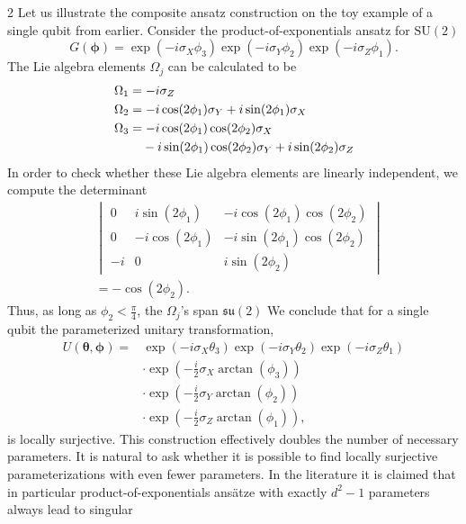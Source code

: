 \documentclass{article}
\renewcommand{\vec}[1]{\ensuremath{\boldsymbol{#1}}}
\begin{document}
\begin{multicols}{2}
Let us illustrate the composite ansatz construction on the toy example of a single qubit from earlier.
Consider the product-of-exponentials ansatz for \(\mathrm{SU}(2)\)
\begin{equation}
    G(\vec{\phi}) = \exp(-i\sigma_X\phi_3)\exp(-i\sigma_Y\phi_2)\exp(-i\sigma_Z\phi_1).
\end{equation}
The Lie algebra elements \(\Omega_j\) can be calculated to be
\begin{align}
    & \Omega_1= -i\sigma_Z \\
    & \Omega_2 = -i\cos(2\phi_1)\sigma_Y + i \sin(2\phi_1)\sigma_X \\
    & \Omega_3 = -i\cos(2\phi_1)\cos(2\phi_2)\sigma_X \\
    & \hphantom{\Omega_3 = } -i\sin(2\phi_1)\cos(2\phi_2)\sigma_Y + i\sin(2\phi_2)\sigma_Z \nonumber
\end{align}
In order to check whether these Lie algebra elements are linearly independent, we compute the determinant
\begin{align}
    &\begin{vmatrix}
        0 & i\sin(2\phi_1) & -i \cos(2\phi_1)\cos(2\phi_2) \\
        0 & -i\cos(2\phi_1) & -i \sin(2\phi_1)\cos(2\phi_2) \\
        -i & 0 & i \sin(2\phi_2)
    \end{vmatrix} \\
    &= -\cos(2\phi_2) \nonumber.
\end{align}
Thus, as long as \(\phi_2 < \frac{\pi}{4}\), the $\Omega_{j}$'s span \(\mathfrak{su}(2)\) 
We conclude that for a single qubit the parameterized unitary transformation, 
\begin{align}
    U(\vec{\theta}, \vec{\phi}) = &\exp(-i\sigma_X\theta_3)\exp(-i\sigma_Y\theta_2)\exp(-i\sigma_Z\theta_1) \nonumber\\
    & \cdot \exp\left(-\frac{i}{2}\sigma_X\arctan(\phi_3)\right) \nonumber\\
    & \cdot \exp\left(-\frac{i}{2}\sigma_Y\arctan(\phi_2)\right) \\
    & \cdot \exp\left(-\frac{i}{2}\sigma_Z\arctan(\phi_1)\right), \nonumber
\end{align}
is locally surjective. This construction effectively doubles the number of necessary parameters. It is natural to ask whether it is possible to find locally surjective parameterizations with even fewer parameters.
In the literature it is claimed that in particular product-of-exponentials ans\"atze with exactly \(d^2-1\) parameters always lead to singular

\end{multicols}
\end{document}
